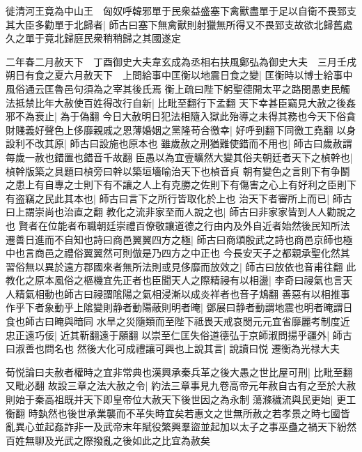 徙清河王竟為中山王　匈奴呼韓邪單于民衆益盛塞下禽獸盡單于足以自衛不畏郅支其大臣多勸單于北歸者|{
	師古曰塞下無禽獸則射獵無所得又不畏郅支故欲北歸舊處}
久之單于竟北歸庭民衆稍稍歸之其國遂定

二年春二月赦天下　丁酉御史大夫韋玄成為丞相右扶風鄭弘為御史大夫　三月壬戌朔日有食之夏六月赦天下　上問給事中匡衡以地震日食之變|{
	匡衡時以博士給事中風俗通云匡魯邑句須為之宰其後氏焉}
衡上疏曰陛下躬聖德開太平之路閔愚吏民觸法抵禁比年大赦使百姓得改行自新|{
	比毗至翻行下孟翻}
天下幸甚臣竊見大赦之後姦邪不為衰止|{
	為于偽翻}
今日大赦明日犯法相隨入獄此殆導之未得其務也今天下俗貪財賤義好聲色上侈靡親戚之恩薄婚姻之黨隆苟合徼幸|{
	好呼到翻下同徼工堯翻}
以身設利不改其原|{
	師古曰設施也原本也}
雖歲赦之刑猶難使錯而不用也|{
	師古曰歲赦謂每歲一赦也錯置也錯音千故翻}
臣愚以為宜壹曠然大變其俗夫朝廷者天下之楨幹也|{
	楨幹版築之具題曰楨旁曰幹以築垣墻喻治天下也楨音貞}
朝有變色之言則下有争鬭之患上有自專之士則下有不讓之人上有克勝之佐則下有傷害之心上有好利之臣則下有盗竊之民此其本也|{
	師古曰言下之所行皆取化於上也}
治天下者審所上而已|{
	師古曰上謂崇尚也治直之翻}
教化之流非家至而人說之也|{
	師古曰非家家皆到人人勸說之也}
賢者在位能者布職朝廷崇禮百僚敬讓道德之行由内及外自近者始然後民知所法遷善日進而不自知也詩曰商邑翼翼四方之極|{
	師古曰商頌殷武之詩也商邑京師也極中也言商邑之禮俗翼翼然可則倣是乃四方之中正也}
今長安天子之都親承聖化然其習俗無以異於遠方郡國來者無所法則或見侈靡而放效之|{
	師古曰放依也音甫往翻}
此教化之原本風俗之樞機宜先正者也臣聞天人之際精祲有以相盪|{
	李奇曰祲氣也言天人精氣相動也師古曰祲謂隂陽之氣相浸漸以成炎祥者也音子鴆翻}
善惡有以相推事作乎下者象動乎上隂變則静者動陽蔽則明者晻|{
	鄧展曰静者動謂地震也明者晻謂日食也師古曰晻與暗同}
水旱之災隨類而至陛下祗畏天戒哀閔元元宜省靡麗考制度近忠正遠巧佞|{
	近其靳翻遠于願翻}
以崇至仁匡失俗道德弘于京師淑問揚乎疆外|{
	師古曰淑善也問名也}
然後大化可成禮讓可興也上說其言|{
	說讀曰悦}
遷衡為光禄大夫

荀悦論曰夫赦者權時之宜非常典也漢興承秦兵革之後大愚之世比屋可刑|{
	比毗至翻又毗必翻}
故設三章之法大赦之令|{
	約法三章事見九卷高帝元年赦自古有之至於大赦則始于秦高祖既并天下即皇帝位大赦天下後世因之為永制}
蕩滌穢流與民更始|{
	更工衡翻}
時埶然也後世承業襲而不革失時宜矣若惠文之世無所赦之若孝景之時七國皆亂異心並起姦詐非一及武帝末年賦役繁興羣盜並起加以太子之事巫蠱之禍天下紛然百姓無聊及光武之際撥亂之後如此之比宜為赦矣

